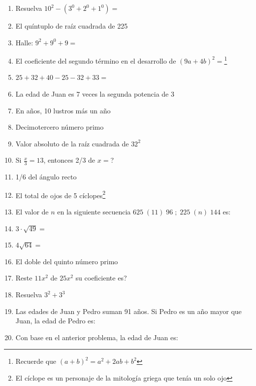\documentclass[letterpaper,10pt,twoside]{article}
\begin{document}
\begin{multicols}{2}
\begin{enumerate}
 \item Resuelva $10^{2}-(3^{0}+2^{0}+1^{0})=$
 \item El quíntuplo de raíz cuadrada de 225
 \item Halle: $9^{2}+9^{0}+9=$
 \item El coeficiente del segundo término en el desarrollo de $(9a+4b)^{2}=$\footnote{Recuerde que $(a+b)^{2}=a^{2}+2ab+b^{2}$}
 \item $25+32+40-25-32+33=$
 \item La edad de Juan es 7 veces la segunda potencia de 3
 \item En años, 10 lustros más un año
 \item Decimotercero número primo
 \item Valor absoluto de la raíz cuadrada de $32^{2}$
 \item Si $\frac{x}{3}=13$, entonces 2/3 de $x=$?
 \item 1/6 del ángulo recto
 \item El total de ojos de 5 cíclopes\footnote{El cíclope es un personaje de la mitología griega que tenía un solo ojo}
 \item El valor de $n$ en la siguiente secuencia $625\;(11)\;96\; ; \;225\;(n)\;144$ es:
 \item $3\cdot\sqrt{49}=$
 \item $4\sqrt{64}=$
 \item El doble del quinto número primo
 \item Reste $11x^{2}$ de $25x^{2}$ su coeficiente es?
 \item Resuelva $3^{2}+3^{3}$
 \item Las edades de Juan y Pedro suman 91 años. Si Pedro es un año mayor que Juan, la edad de Pedro es:
 \item Con base en el anterior problema, la edad de Juan es:
 \end{enumerate}
\end{multicols}
\end{document}
